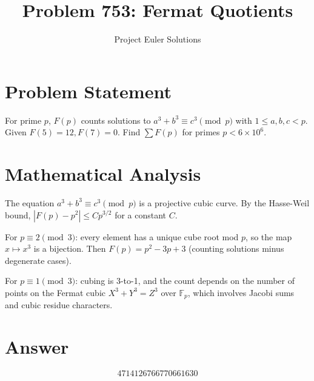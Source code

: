 \documentclass[11pt]{article}
\title{Problem 753: Fermat Quotients}
\author{Project Euler Solutions}
\date{}
\begin{document}
\maketitle


\section{Problem Statement}
For prime $p$, $F(p)$ counts solutions to $a^3+b^3\equiv c^3 \pmod p$ with $1\le a,b,c<p$. Given $F(5)=12, F(7)=0$. Find $\sum F(p)$ for primes $p < 6\times 10^6$.

\section{Mathematical Analysis}
The equation $a^3+b^3\equiv c^3 \pmod p$ is a projective cubic curve. By the Hasse-Weil bound, $|F(p) - p^2| \le C p^{3/2}$ for a constant $C$.

For $p \equiv 2 \pmod 3$: every element has a unique cube root mod $p$, so the map $x \mapsto x^3$ is a bijection. Then $F(p) = p^2 - 3p + 3$ (counting solutions minus degenerate cases).

For $p \equiv 1 \pmod 3$: cubing is 3-to-1, and the count depends on the number of points on the Fermat cubic $X^3+Y^3=Z^3$ over $\mathbb{F}_p$, which involves Jacobi sums and cubic residue characters.

\section{Answer}

\[
\boxed{4714126766770661630}
\]
\end{document}
